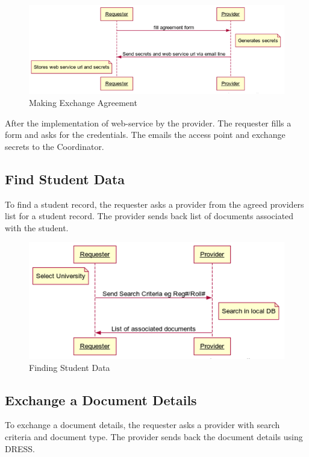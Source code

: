 \documentclass[12pt,a4paper,oneside]{book}
\begin{document}
\begin{figure}[!htp]
  \centering
  \includegraphics[width=14cm]{sq_agreement.png}
  \caption{Making Exchange Agreement}
  \label{fig:sq_agreement}
\end{figure}


After the implementation of web-service by the provider. The requester fills a form and asks for the credentials. The emails the access point and exchange secrets to the Coordinator.

    \subsection{Find Student Data}
    To find a student record, the requester asks a provider from the agreed providers list for a student record. The provider sends back list of documents associated with the student.

\begin{figure}[!hbp]
  \centering
  \includegraphics[width=14cm]{sq_find_student_data.png}
  \caption{Finding Student Data}
  \label{fig:sq_find_student_data}
\end{figure}

    \subsection{Exchange a Document Details}
    To exchange a document details, the requester asks a provider with search criteria and document type. The provider sends back the document details using DRESS.
\end{document}

